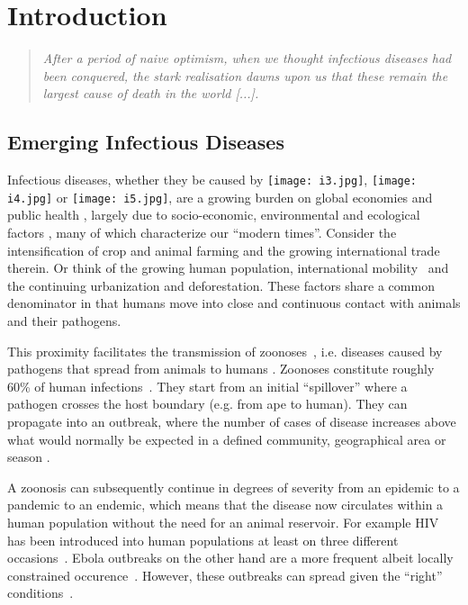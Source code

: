 \section{Introduction}


\begin{quotation}
    \emph{After a period of naive optimism, when we thought infectious diseases had been conquered, the stark realisation dawns upon us that these remain the largest cause of death in the world [...].}~\cite{De_Kruif2002-ra}
\end{quotation}


\subsection{Emerging Infectious Diseases}

Infectious diseases, whether they be caused by \texttt{[image: i3.jpg]}, \texttt{[image: i4.jpg]} or \texttt{[image: i5.jpg]}, are a growing burden on global economies and public health \cite{Nichol2000-hn, Smith2014-km}, largely due to socio-economic, environmental and ecological factors \cite{Smith2007-sg, Jones2008-mw}, many of which characterize our ``modern times''. Consider the intensification of crop and animal farming and the growing international trade therein. Or think of the growing human population, international mobility~\cite{Bryant2007-lr} and the continuing urbanization and deforestation. These factors share a common denominator in that humans move into close and continuous contact with animals and their pathogens.

This proximity facilitates the transmission of zoonoses~\cite{Wolfe2007-iy, Wolfe2011-sl}, i.e. diseases caused by pathogens that spread from animals to humans \cite{Jones2008-mw}. Zoonoses constitute roughly 60\% of human infections~\cite{Quammen2013-ox}. They start from an initial ``spillover'' where a pathogen crosses the host boundary (e.g. from ape to human). They can propagate into an outbreak,  where the number of cases of disease increases above what would normally be expected in a defined community, geographical area or season \cite{Smith2014-km}.

A zoonosis can subsequently continue in degrees of severity from an epidemic to a pandemic to an endemic, which means that the disease now circulates within a human population without the need for an animal reservoir. For example HIV has been introduced into human populations at least on three different occasions~\cite{Holmes2009-cu}. Ebola outbreaks on the other hand are a more frequent albeit locally constrained occurence~\cite{Quammen2014-lg}. However, these outbreaks can spread given the ``right'' conditions~\cite{Holmes2016-wm, Dudas2017-ku}.

